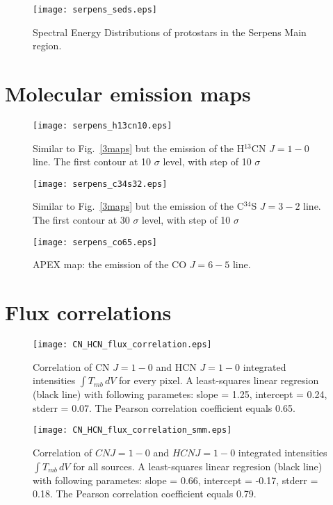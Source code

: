 \documentclass{aa}
\begin{document}
\begin{appendix}
\begin{figure}
   \texttt{[image: serpens\_seds.eps]}
      \caption{Spectral Energy Distributions of protostars in the Serpens Main region.}
         \label{seds}
   \end{figure}

\section{Molecular emission maps}

\begin{figure}
\texttt{[image: serpens\_h13cn10.eps]}
\caption{Similar to Fig.~\ref{3maps} but the emission of the H$^{13}$CN $J=1-0$ line. The first contour at 10 $\sigma$ level, with step of 10 $\sigma$}
\label{h13cn10}
\end{figure}


\begin{figure}
\texttt{[image: serpens\_c34s32.eps]}
\caption{Similar to Fig.~\ref{3maps} but the emission of the C$^{34}$S $J=3-2$ line. The first contour at 30 $\sigma$ level, with step of 10 $\sigma$}
\label{c34s32}
\end{figure}

\begin{figure}
\texttt{[image: serpens\_co65.eps]}
\caption{APEX map: the emission of the CO $J=6-5$ line.}
\label{c34s32}
\end{figure}



\section{Flux correlations}

\begin{figure}
\texttt{[image: CN\_HCN\_flux\_correlation.eps]}
\caption{Correlation of CN $J=1-0$ and HCN $J=1-0$ integrated intensities $\int{T_{mb} \, dV}$ for every pixel. A least-squares linear regresion (black line) with following parametes: slope = 1.25, intercept = 0.24, stderr = 0.07. The Pearson correlation coefficient equals 0.65. }
\label{CN_HCN_corr_all}
\end{figure}

\begin{figure}
\texttt{[image: CN\_HCN\_flux\_correlation\_smm.eps]}
\caption{Correlation of $CN J=1-0$ and $HCN J=1-0$ integrated intensities $\int{T_{mb} \, dV}$ for all sources. A least-squares linear regresion (black line) with following parametes: slope = 0.66, intercept = -0.17, stderr = 0.18. The Pearson correlation coefficient equals 0.79. }
\label{CN_HCN_corr_smm}
\end{figure}


\end{appendix}
\end{document}
